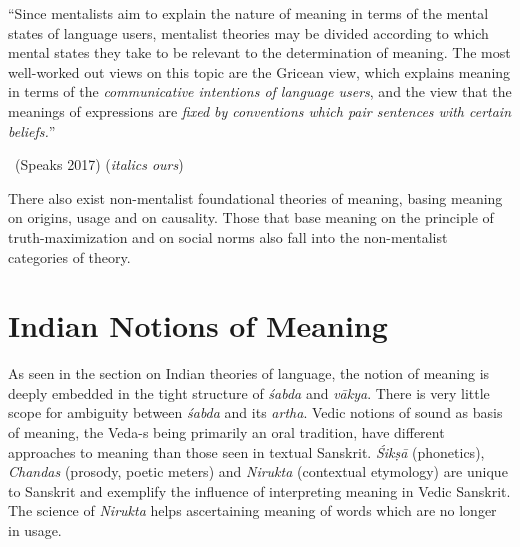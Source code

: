 \begin{myquote}
“Since mentalists aim to explain the nature of meaning in terms of the mental states of language users, mentalist theories may be divided according to which mental states they take to be relevant to the determination of meaning. The most well-worked out views on this topic are the Gricean view, which explains meaning in terms of the \textit{communicative intentions of language users}, and the view that the meanings of expressions are \textit{fixed by conventions which pair sentences with certain beliefs.}”

~\hfill (Speaks 2017) (\textit{italics ours})
\end{myquote}

There also exist non-mentalist foundational theories of meaning, basing meaning on origins, usage and on causality. Those that base meaning on the principle of truth-maximization and on social norms also fall into the non-mentalist categories of theory.


\section*{Indian Notions of Meaning}

As seen in the section on Indian theories of language, the notion of meaning is deeply embedded in the tight structure of \textit{śabda} and \textit{vākya}. There is very little scope for ambiguity between \textit{śabda} and its \textit{artha}. Vedic notions of sound as basis of meaning, the Veda-s being primarily an oral tradition, have different approaches to meaning than those seen in textual Sanskrit. \textit{Śikṣā} (phonetics), \textit{Chandas} (prosody, poetic meters) and \textit{Nirukta} (contextual etymology) are unique to Sanskrit and exemplify the influence of interpreting meaning in Vedic Sanskrit. The science of \textit{Nirukta} helps ascertaining meaning of words which are no longer in usage.

